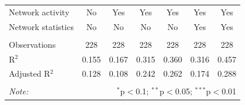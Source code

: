 \begin{table}[!htbp]
\begin{tabular}{@{\extracolsep{5pt}}lcccccc}
Network activity & No & Yes & Yes & Yes & Yes & Yes \\ 
Network statistics & No & No & No & No & Yes & Yes \\ 
\hline &  &  &  &  &  &  \\ 
Observations & 228 & 228 & 228 & 228 & 228 & 228 \\ 
R$^{2}$ & 0.155 & 0.167 & 0.315 & 0.360 & 0.316 & 0.457 \\ 
Adjusted R$^{2}$ & 0.128 & 0.108 & 0.242 & 0.262 & 0.174 & 0.288 \\ 
\hline 
\hline \\[-1.8ex] 
\textit{Note:}  & \multicolumn{6}{r}{$^{*}$p$<$0.1; $^{**}$p$<$0.05; $^{***}$p$<$0.01} \\ 
\end{tabular} 
\end{table} 

